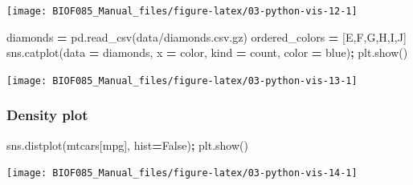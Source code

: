\documentclass[
  letterpaper,
]{scrbook}
\newenvironment{Shaded}{\begin{snugshade}}{\end{snugshade}}
\newcommand{\NormalTok}[1]{#1}
\newcommand{\OperatorTok}[1]{\textcolor[rgb]{0.81,0.36,0.00}{\textbf{#1}}}
\newcommand{\StringTok}[1]{\textcolor[rgb]{0.31,0.60,0.02}{#1}}
\newcommand{\VariableTok}[1]{\textcolor[rgb]{0.00,0.00,0.00}{#1}}
\begin{document}
\begin{center}\texttt{[image: BIOF085\_Manual\_files/figure-latex/03-python-vis-12-1]} \end{center}

\begin{Shaded}
\begin{Highlighting}[]
\NormalTok{diamonds }\OperatorTok{=}\NormalTok{ pd.read\_csv(}\StringTok{\textquotesingle{}data/diamonds.csv.gz\textquotesingle{}}\NormalTok{)}
\NormalTok{ordered\_colors }\OperatorTok{=}\NormalTok{ [}\StringTok{\textquotesingle{}E\textquotesingle{}}\NormalTok{,}\StringTok{\textquotesingle{}F\textquotesingle{}}\NormalTok{,}\StringTok{\textquotesingle{}G\textquotesingle{}}\NormalTok{,}\StringTok{\textquotesingle{}H\textquotesingle{}}\NormalTok{,}\StringTok{\textquotesingle{}I\textquotesingle{}}\NormalTok{,}\StringTok{\textquotesingle{}J\textquotesingle{}}\NormalTok{]}
\NormalTok{sns.catplot(data }\OperatorTok{=}\NormalTok{ diamonds, x }\OperatorTok{=} \StringTok{\textquotesingle{}color\textquotesingle{}}\NormalTok{, kind }\OperatorTok{=} \StringTok{\textquotesingle{}count\textquotesingle{}}\NormalTok{, color }\OperatorTok{=} \StringTok{\textquotesingle{}blue\textquotesingle{}}\NormalTok{)}\OperatorTok{;}
\NormalTok{plt.show()}
\end{Highlighting}
\end{Shaded}

\begin{center}\texttt{[image: BIOF085\_Manual\_files/figure-latex/03-python-vis-13-1]} \end{center}

\hypertarget{density-plot-1}{%
\subsubsection{Density plot}\label{density-plot-1}}

\begin{Shaded}
\begin{Highlighting}[]
\NormalTok{sns.distplot(mtcars[}\StringTok{\textquotesingle{}mpg\textquotesingle{}}\NormalTok{], hist}\OperatorTok{=}\VariableTok{False}\NormalTok{)}\OperatorTok{;}
\NormalTok{plt.show()}
\end{Highlighting}
\end{Shaded}

\begin{center}\texttt{[image: BIOF085\_Manual\_files/figure-latex/03-python-vis-14-1]} \end{center}
\end{document}
